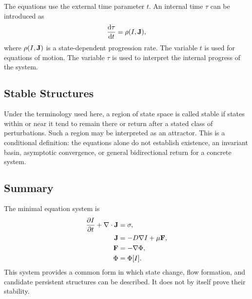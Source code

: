 The equations use the external time parameter \(t\). An internal time \(\tau\) can be introduced as
\begin{equation}
  \frac{\mathrm{d} \tau}{\mathrm{d} t} = \rho(I,\mathbf{J}),
\end{equation}
where \(\rho(I,\mathbf{J})\) is a state-dependent progression rate. The variable \(t\) is used for equations of motion. The variable \(\tau\) is used to interpret the internal progress of the system.

\subsection{Stable Structures}

Under the terminology used here, a region of state space is called stable if states within or near it tend to remain there or return after a stated class of perturbations. Such a region may be interpreted as an attractor. This is a conditional definition: the equations alone do not establish existence, an invariant basin, asymptotic convergence, or general bidirectional return for a concrete system.

\subsection{Summary}

The minimal equation system is
\begin{align}
  \frac{\partial I}{\partial t} + \nabla \cdot \mathbf{J} &= \sigma,\\
  \mathbf{J} &= -D\nabla I + \mu \mathbf{F},\\
  \mathbf{F} &= -\nabla \Phi,\\
  \Phi &= \Phi[I].
\end{align}
This system provides a common form in which state change, flow formation, and candidate persistent structures can be described. It does not by itself prove their stability.
